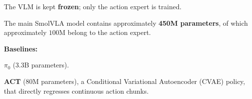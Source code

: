 \begin{dashlist}
    \item The VLM is kept \textbf{frozen}; only the action expert is trained.
    \item The main SmolVLA model contains approximately \textbf{450M parameters}, of which approximately $100$M belong to the action expert.
    \item \textbf{Baselines:}
    \begin{dashlist}
        \item \textbf{$\pi_0$}  ($3.3$B parameters).
        \item \textbf{ACT} ($80$M parameters), a Conditional Variational Autoencoder (CVAE) policy, that directly regresses continuous action chunks.
    \end{dashlist}
\end{dashlist}

